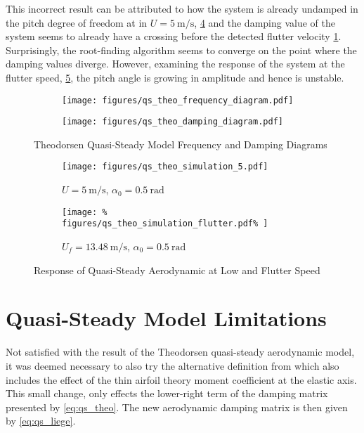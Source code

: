 This incorrect result can be attributed to how the system is already undamped
in the pitch degree of freedom at in $U=\SI{5}{\meter\per\second}$,
\cref{fig:qs_5} and the damping value of the system seems to already have a
crossing before the detected flutter velocity \cref{fig:qs_theo_frequency}.
Surprisingly, the root-finding algorithm seems to converge on the point where
the damping values diverge. However, examining the response of the system at
the flutter speed, \cref{fig:qs_sim_flutter}, the pitch angle is
growing in amplitude and hence is unstable.

\begin{figure}[H]
    \centering
    \begin{subfigure}[b]{0.5\textwidth}
      \centering
      \texttt{[image: figures/qs\_theo\_frequency\_diagram.pdf]}
      \label{fig:qs_theo_frequency}
    \end{subfigure}%
    \begin{subfigure}[b]{0.5\textwidth}
      \centering
      \texttt{[image: figures/qs\_theo\_damping\_diagram.pdf]}
      \label{fig:qs_theo_damping}
    \end{subfigure}
    \caption{Theodorsen Quasi-Steady Model Frequency and Damping Diagrams} %
    \label{fig:qs_flutter_diagram}
\end{figure}

\begin{figure}[H]
    \centering
    \begin{subfigure}[b]{0.5\textwidth}
        \centering
        \texttt{[image: figures/qs\_theo\_simulation\_5.pdf]}
        \caption{$U =\SI{5}{\meter\per\second}$, $\alpha_0=\SI{0.5}{\radian}$}
        \label{fig:qs_5}
    \end{subfigure}%
    \begin{subfigure}[b]{0.5\textwidth}
        \centering
        \texttt{[image: \%
            figures/qs\_theo\_simulation\_flutter.pdf\%
        ]}
        \caption{$U_f =\SI{13.48}{\meter\per\second}$, $\alpha_0=\SI{0.5}{\radian}$}
        \label{fig:qs_sim_flutter}
    \end{subfigure}
    \caption{Response of Quasi-Steady Aerodynamic at Low and Flutter Speed}
    \label{fig:qs_simulations}
\end{figure}

\section{Quasi-Steady Model Limitations}
Not satisfied with the result of the Theodorsen quasi-steady aerodynamic model,
it was deemed necessary to also try the alternative definition from
\autocite[s.2]{andrianneLectureDynamicAeroelasticity} which also includes the
effect of the thin airfoil theory moment coefficient at the elastic axis. This
small change, only effects the lower-right term of the damping matrix presented
by \cref{eq:qs_theo}. The new aerodynamic damping matrix is then given by
\cref{eq:qs_liege}.

